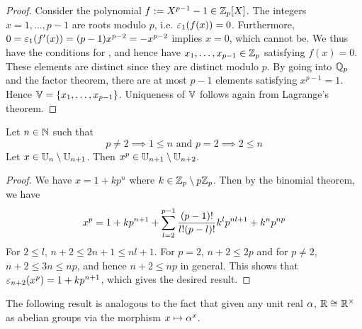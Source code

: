 \begin{proof}
  Consider the polynomial $f := X^{p-1} - 1 \in \mathbb{Z}_p[X]$.
  The integers $x = 1, \dots, p - 1$ are roots modulo $p$,
  i.e. $\varepsilon_1(f(x)) = 0$. 
  Furthermore, $0 = \varepsilon_1(f'(x)) = (p - 1)x^{p-2} = - x^{p-2}$ 
  implies $x = 0$, which cannot be. 
  We thus have the conditions for ,
  and hence have $x_1,\dots,x_{p-1} \in \mathbb{Z}_p$ satisfying $f(x) = 0$. 
  These elements are distinct since they are distinct modulo $p$. 
  By going into $\mathbb{Q}_p$ and the factor theorem,
  there are at most $p-1$ elements satisfying $x^{p-1} = 1$.
  Hence $\mathbb{V} = \left\{x_1,\dots,x_{p-1}\right\}$. 
  Uniqueness of $\mathbb{V}$ follows again from Lagrange's theorem. 
\end{proof}

\begin{prop}
  
  Let $n \in \mathbb{N}$ such that 
  \[
    p \neq 2 \implies 1 \leq n \text{ and }
    p = 2 \implies 2 \leq n
  \]
  Let $x \in \mathbb{U}_n\setminus\mathbb{U}_{n+1}$. 
  Then $x^p \in \mathbb{U}_{n+1}\setminus\mathbb{U}_{n+2}$. 
\end{prop}
\begin{proof}
  We have $x = 1 + k p^n$ where $k \in \mathbb{Z}_p \setminus p\mathbb{Z}_p$.
  Then by the binomial theorem, we have \[
    x^p = 1 + k p^{n+1}
    + \sum_{l = 2}^{p-1} \frac{(p-1)!}{l!(p-l)!} k^l p^{n l + 1} 
    + k^n p^{np}
  \]
  For $2 \leq l$, $n+2 \leq 2n + 1 \leq n l + 1$. 
  For $p = 2$, $n + 2 \leq 2 p$ and 
  for $p \neq 2$, $n + 2 \leq 3n \leq n p$,
  and hence $n+2 \leq np$ in general. 
  This shows that $\varepsilon_{n+2}(x^p) = 1 + k p^{n+1}$,
  which gives the desired result. 
\end{proof}

\begin{rmk}
  
  The following result is analogous to the fact that 
  given any unit real $\alpha$, 
  $\mathbb{R} \cong_{} \mathbb{R}^\times$ as abelian groups via the morphism 
  $x \mapsto \alpha^x$. 
\end{rmk}

